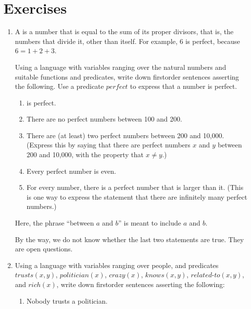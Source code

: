 \documentclass[letterpaper,10pt,english]{sphinxmanual}
\begin{document}
\section{Exercises}
\label{\detokenize{first_order_logic:exercises}}\begin{enumerate}
%
\item {} 
\sphinxAtStartPar
A  is a number that is equal to the sum of its proper divisors, that is, the numbers that divide it, other than itself. For example, 6 is perfect, because \(6 = 1 + 2 + 3\).

\sphinxAtStartPar
Using a language with variables ranging over the natural numbers and suitable functions and predicates, write down first\sphinxhyphen{}order sentences asserting the following. Use a predicate \(\mathit{perfect}\) to express that a number is perfect.
\begin{enumerate}
%
\item {} 
 is perfect.

\item {} 
\sphinxAtStartPar
There are no perfect numbers between 100 and 200.

\item {} 
\sphinxAtStartPar
There are (at least) two perfect numbers between 200 and 10,000. (Express this by saying that there are perfect numbers \(x\) and \(y\) between 200 and 10,000, with the property that \(x \neq y\).)

\item {} 
\sphinxAtStartPar
Every perfect number is even.

\item {} 
\sphinxAtStartPar
For every number, there is a perfect number that is larger than it. (This is one way to express the statement that there are infinitely many perfect numbers.)

\end{enumerate}

\sphinxAtStartPar
Here, the phrase “between \(a\) and \(b\)” is meant to include \(a\) and \(b\).

\sphinxAtStartPar
By the way, we do not know whether the last two statements are true. They are open questions.

\item {} 
\sphinxAtStartPar
Using a language with variables ranging over people, and predicates \(\mathit{trusts}(x,y)\), \(\mathit{politician}(x)\), \(\mathit{crazy(x)}\), \(\mathit{knows}(x, y)\), \(\mathit{related\mathord{\mbox{-}}to}(x, y)\), and \(\mathit{rich}(x)\), write down first\sphinxhyphen{}order sentences asserting the following:
\begin{enumerate}
%
\item {} 
\sphinxAtStartPar
Nobody trusts a politician.


\end{enumerate}
\end{enumerate}
\end{document}
